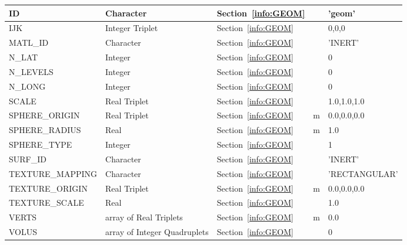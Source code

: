 \documentclass[12pt]{article}
\begin{document}
\begin{longtable}{@{\extracolsep{\fill}}|l|l|l|l|l|}
{\ct ID}           & Character              & Section~\ref{info:GEOM}            &           &   {\ct 'geom'}           \\ \hline
{\ct IJK}          & Integer Triplet        & Section~\ref{info:GEOM}            &           &   0,0,0                  \\ \hline
{\ct MATL\_ID}     & Character              & Section~\ref{info:GEOM}            &           &  {\ct 'INERT'}           \\ \hline
{\ct N\_LAT}       & Integer                & Section~\ref{info:GEOM}            &           &   0                      \\ \hline
{\ct N\_LEVELS}    & Integer                & Section~\ref{info:GEOM}            &           &   0                      \\ \hline
{\ct N\_LONG}      & Integer                & Section~\ref{info:GEOM}            &           &   0                      \\ \hline
{\ct SCALE}        & Real Triplet           & Section~\ref{info:GEOM}            &           &   1.0,1.0,1.0            \\ \hline
{\ct SPHERE\_ORIGIN}& Real Triplet          & Section~\ref{info:GEOM}            &   m       &  0.0,0.0,0.0             \\ \hline
{\ct SPHERE\_RADIUS}& Real                  & Section~\ref{info:GEOM}            &   m       &  1.0                     \\ \hline
{\ct SPHERE\_TYPE} & Integer                & Section~\ref{info:GEOM}            &           &  1                       \\ \hline
{\ct SURF\_ID}     & Character              & Section~\ref{info:GEOM}            &           &  {\ct 'INERT'}           \\ \hline
{\ct TEXTURE\_MAPPING}& Character           & Section~\ref{info:GEOM}            &           & {\ct 'RECTANGULAR'}      \\ \hline
{\ct TEXTURE\_ORIGIN} & Real Triplet        & Section~\ref{info:GEOM}            &   m       &   0.0,0.0,0.0            \\ \hline
{\ct TEXTURE\_SCALE}& Real                  & Section~\ref{info:GEOM}            &           &   1.0                    \\ \hline
{\ct VERTS}        & array of Real Triplets & Section~\ref{info:GEOM}            &   m       &   0.0                    \\ \hline
{\ct VOLUS}        & array of Integer Quadruplets     & Section~\ref{info:GEOM}  &           &    0                     \\ \hline

\end{longtable}
\end{document}
